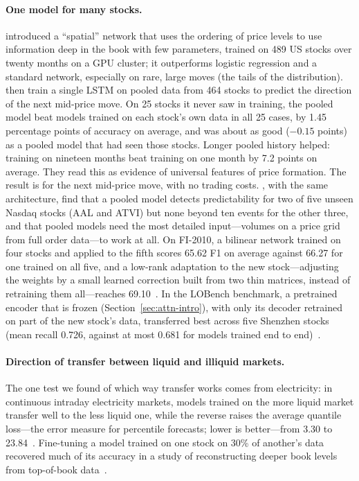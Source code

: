 \paragraph{One model for many stocks.} \citet{sirignano2019dl} introduced a ``spatial'' network that uses
the ordering of price levels to use information deep in the book with few parameters, trained on 489 US
stocks over twenty months on a GPU cluster; it outperforms logistic regression and a standard network,
especially on rare, large moves (the tails of the distribution). \citet{sirignano2019} then train a single LSTM on pooled data
from 464 stocks to predict the direction of the next mid-price move. On 25 stocks it never saw in training,
the pooled model beat models trained on each stock's own data in all 25 cases, by 1.45 percentage points of
accuracy on average, and was about as good ($-0.15$ points) as a pooled model that had seen those stocks.
Longer pooled history helped: training on nineteen months beat training on one month by 7.2 points on
average. They read this as evidence of universal features of price formation. The result is for the next
mid-price move, with no trading costs. \citet{lucchese2024}, with the same
architecture, find that a pooled model detects predictability for two of five unseen Nasdaq stocks
(AAL and ATVI) but none beyond ten events for the other three, and that pooled models need the most detailed
input---volumes on a price grid from full order data---to work at all. On FI-2010, a bilinear network trained
on four stocks and applied to the fifth scores 65.62 F1 on average against 66.27 for one trained on all five,
and a low-rank adaptation to the new stock---adjusting the weights by a small learned correction built from two thin
matrices, instead of retraining them all---reaches 69.10~\citep{shabani2023abn}. In the LOBench benchmark, a
pretrained encoder that is frozen (Section~\ref{sec:attn-intro}), with only its decoder retrained on part of the new
stock's data, transferred best across
five Shenzhen stocks (mean recall 0.726, against at most 0.681 for models trained end to
end)~\citep{zhong2025lobench}.

\paragraph{Direction of transfer between liquid and illiquid markets.} The one test we found of which way transfer works comes from electricity:
in continuous intraday electricity markets, models trained on the more liquid market transfer well to the less liquid
one, while the reverse raises the average quantile loss---the error measure for percentile forecasts; lower is
better---from 3.30 to 23.84~\citep{yu2025asymgen}. Fine-tuning a model trained on one stock on 30\% of another's data
recovered much of its accuracy in a study of reconstructing deeper book levels from top-of-book
data~\citep{shi2021lobrm}.

